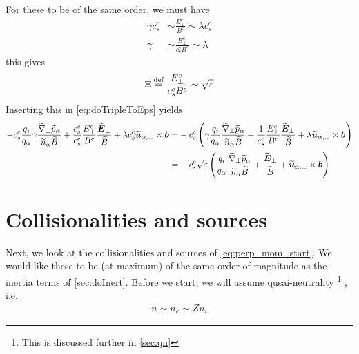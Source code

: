 %
For these to be of the same order, we must have
%
\begin{align*}
    \gamma c^c_s &\sim \frac{E_\perp^c}{B^c} \sim \lambda c^c_s \\
    \gamma     &\sim \frac{E_\perp^c}{c^c_sB^c} \sim \lambda
\end{align*}
%
this gives
%
\begin{align*}
    \Xi \overset{\text{def}}{=} \frac{E_\perp^c}{c^c_sB^c} \sim \sqrt{\varepsilon}
\end{align*}
%
Inserting this in \cref{eq:doTripleToEps} yields
%
\begin{align*}
-
c^c_s
\frac{q_i}{q_\a}
\gamma
\frac{ \wt{\grad}_\perp \wt{p}_\a }{\wt{n}_\a \wt{B}}
+ \frac{c^c_s}{c^c_s}\frac{E_\perp^c}{B^c}
\frac{\wt{\ve{E}}_\perp}{\wt{B}}
+\lambda c^c_s
\wt{\ve{u}}_{\a,\perp}\times\ve{b}
=&
-
c^c_s
\L(
\gamma
\frac{q_i}{q_\a}
\frac{ \wt{\grad}_\perp \wt{p}_\a }{\wt{n}_\a \wt{B}}
+ \frac{1}{c^c_s}\frac{E_\perp^c}{B^c}
\frac{\wt{\ve{E}}_\perp}{\wt{B}}
+\lambda
\wt{\ve{u}}_{\a,\perp}\times\ve{b}
\R)
\\
%
%
=&
-
c^c_s
\sqrt{\e}
\L(
\frac{q_i}{q_\a}
\frac{ \wt{\grad}_\perp \wt{p}_\a }{\wt{n}_\a \wt{B}}
+
\frac{\wt{\ve{E}}_\perp}{\wt{B}}
+
\wt{\ve{u}}_{\a,\perp}\times\ve{b}
\R)
\end{align*}

\section{Collisionalities and sources}
%
Next, we look at the collisionalities and sources of \cref{eq:perp_mom_start}.
We would like these to be (at maximum) of the same order of magnitude as the inertia terms of \cref{sec:doInert}.
Before we start, we will assume qusai-neutrality%
\footnote{This is discussed further in \cref{sec:qn}}%
%
, i.e.
%
\begin{align*}
    n\sim n_e \sim Zn_i
\end{align*}
%

